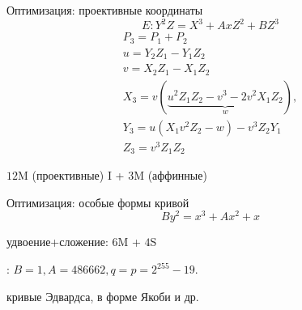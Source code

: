 \documentclass{beamer}
\begin{document}
\begin{frame}{Оптимизация: проективные координаты}
    \[E: Y^2 Z = X^3+ A x Z^2 + B Z^3\]
    \begin{gather*}
        P_3 = P_1 + P_2 \\
        u = Y_2 Z_1 - Y_1 Z_2\\
        v = X_2 Z_1 - X_1 Z_2 \\
        X_3 = v(\underbrace{u^2 Z_1 Z_2 - v^3 - 2 v^2 X_1 Z_2}_w), \\
        Y_3 = u(X_1 v^2 Z_2 - w) - v^3 Z_2 Y_1 \\
        Z_3 = v^3 Z_1 Z_2
    \end{gather*}
    \begin{center}
        \begin{tcolorbox}[enhanced,hbox,colback=box-blue-color!15,colframe=box-blue-color,title=Сложность,center title]
            \begin{varwidth}{\textwidth}
                $12$M (проективные)  I + $3$M (аффинные)
            \end{varwidth}
        \end{tcolorbox}	
    \end{center}
\end{frame}

\begin{frame}{Оптимизация: особые формы кривой}
   \[
   B y^2 = x^3 + A x^2 + x
   \]
   \begin{center}
       \begin{tcolorbox}[enhanced,hbox,colback=box-blue-color!15,colframe=box-blue-color,title=Сложность,center title]
           \begin{varwidth}{\textwidth}
               удвоение+сложение: $6$M + $4$S
           \end{varwidth}
       \end{tcolorbox}	
   \end{center}
   : $B = 1, A = 486662, q=p=2^{255} - 19$.
   
    кривые Эдвардса, в форме Якоби и др.
\end{frame}

\end{document}
